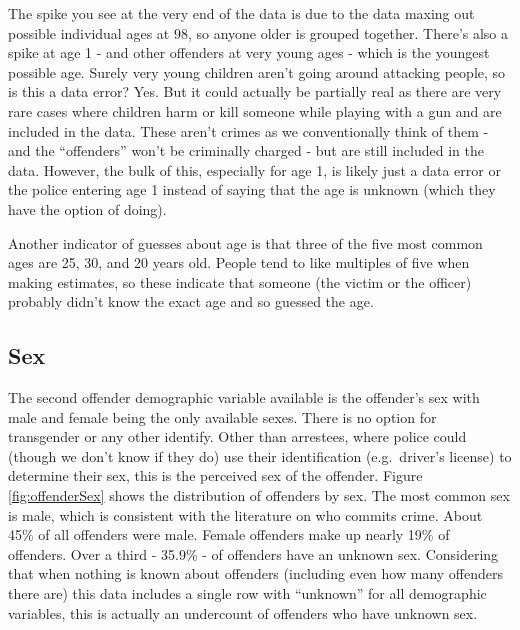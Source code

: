 \documentclass[
]{krantz}
\begin{document}
The spike you see at the very end of the data is due to the
data maxing out possible individual ages at 98, so anyone
older is grouped together. There's also a spike at age 1 -
and other offenders at very young ages - which is the
youngest possible age. Surely very young children aren't
going around attacking people, so is this a data error? Yes.
But it could actually be partially real as there are very
rare cases where children harm or kill someone while playing
with a gun and are included in the data. These aren't crimes
as we conventionally think of them - and the ``offenders''
won't be criminally charged - but are still included in the
data. However, the bulk of this, especially for age 1, is
likely just a data error or the police entering age 1
instead of saying that the age is unknown (which they have
the option of doing).

Another indicator of guesses about age is that three of the
five most common ages are 25, 30, and 20 years old. People
tend to like multiples of five when making estimates, so
these indicate that someone (the victim or the officer)
probably didn't know the exact age and so guessed the age.

\subsection{Sex}\label{sex-1}

The second offender demographic variable available is the
offender's sex with male and female being the only available
sexes. There is no option for transgender or any other
identify. Other than arrestees, where police could (though
we don't know if they do) use their identification
(e.g.~driver's license) to determine their sex, this is the
perceived sex of the offender. Figure \ref{fig:offenderSex}
shows the distribution of offenders by sex. The most common
sex is male, which is consistent with the literature on who
commits crime. About 45\% of all offenders were male. Female
offenders make up nearly 19\% of offenders. Over a third -
35.9\% - of offenders have an unknown sex. Considering that
when nothing is known about offenders (including even how
many offenders there are) this data includes a single row
with ``unknown'' for all demographic variables, this is
actually an undercount of offenders who have unknown sex.
\end{document}
